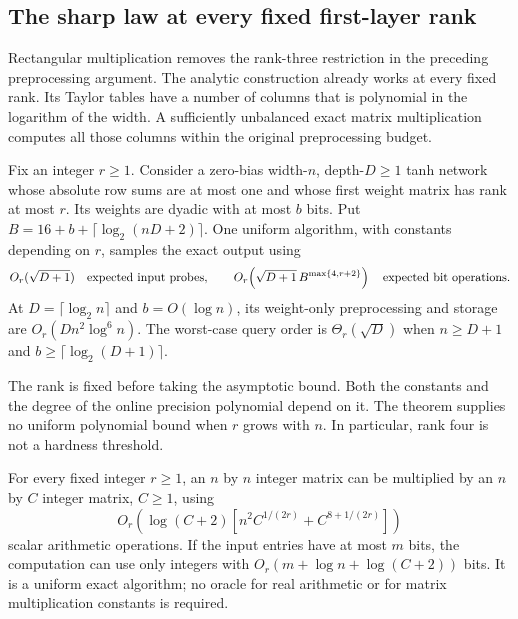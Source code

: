 \subsection{The sharp law at every fixed first-layer rank}
\label{sec:fixed-rank-batching}

Rectangular multiplication removes the rank-three restriction in the
preceding preprocessing argument. The analytic construction already works
at every fixed rank. Its Taylor tables have a number of columns that is
polynomial in the logarithm of the width. A sufficiently unbalanced exact
matrix multiplication computes all those columns within the original
preprocessing budget.

\begin{theorem}
\label{thm:fixed-rank-critical}
Fix an integer $r\ge1$. Consider a zero-bias width-$n$, depth-$D\ge1$
tanh network whose absolute row sums are at most one and whose first
weight matrix has rank at most $r$. Its weights are dyadic with at most
$b$ bits. Put $B=16+b+\lceil\log_2(nD+2)\rceil$.
One uniform algorithm, with constants depending on $r$, samples the
exact output using
\[
 O_r(\sqrt{D+1})\quad\hbox{expected input probes},\qquad
 O_r\!\left(\sqrt{D+1}\,B^{\max\{4,r+2\}}\right)
 \quad\hbox{expected bit operations}.
\]
At $D=\lceil\log_2n\rceil$ and $b=O(\log n)$, its weight-only
preprocessing and storage are $O_r(Dn^2\log^6n)$.
The worst-case query order is $\Theta_r(\sqrt D)$ when
$n\ge D+1$ and $b\ge\lceil\log_2(D+1)\rceil$.
\end{theorem}

The rank is fixed before taking the asymptotic bound. Both the constants
and the degree of the online precision polynomial depend on it. The
theorem supplies no uniform polynomial bound when $r$ grows with $n$.
In particular, rank four is not a hardness threshold.

\begin{lemma}
\label{lem:fixed-rank-rectangular-batching}
For every fixed integer $r\ge1$, an $n$ by $n$ integer matrix can be
multiplied by an $n$ by $C$ integer matrix, $C\ge1$, using
\[
 O_r\!\left(\log(C+2)
 \left[n^2C^{1/(2r)}+C^{8+1/(2r)}\right]\right)
 \tag{*}\label{eq:fixed-rank-rectangular-work}
\]
scalar arithmetic operations. If the input entries have at most $m$
bits, the computation can use only integers with
$O_r(m+\log n+\log(C+2))$ bits. It is a uniform exact algorithm;
no oracle for real arithmetic or for matrix multiplication constants
is required.
\end{lemma}

